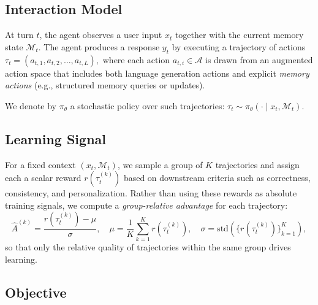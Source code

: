 \documentclass{article}
\begin{document}
\subsection{Interaction Model}

At turn $t$, the agent observes a user input $x_t$ together with the current memory state $\mathcal{M}_t$.  
The agent produces a response $y_t$ by executing a trajectory of actions
$
\tau_t = (a_{t,1}, a_{t,2}, \ldots, a_{t,L}),
$
where each action $a_{t,i} \in \mathcal{A}$ is drawn from an augmented action space that includes both language generation actions and explicit \emph{memory actions} (e.g., structured memory queries or updates).

We denote by $\pi_\theta$ a stochastic policy over such trajectories:
$
\tau_t \sim \pi_\theta(\cdot \mid x_t, \mathcal{M}_t).
$



\subsection{Learning Signal}

For a fixed context $(x_t, \mathcal{M}_t)$, we sample a group of $K$ trajectories and assign each a scalar reward $r(\tau_t^{(k)})$ based on downstream criteria such as correctness, consistency, and personalization. Rather than using these rewards as absolute training signals, we compute a \emph{group-relative advantage} for each trajectory:
\[
\hat{A}^{(k)} = \frac{r(\tau_t^{(k)}) - \mu}{\sigma}, \quad \mu = \frac{1}{K}\sum_{k=1}^{K} r(\tau_t^{(k)}), \quad \sigma = \mathrm{std}\!\left(\{r(\tau_t^{(k)})\}_{k=1}^{K}\right),
\]
so that only the relative quality of trajectories within the same group drives learning.

\subsection{Objective}
\end{document}
